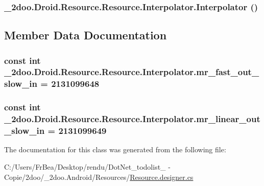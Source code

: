 \hypertarget{class__2doo_1_1_droid_1_1_resource_1_1_interpolator_e0b1f5f02599ec7e0eb2381eec78967a}{
\subsubsection[{Interpolator}]{\setlength{\rightskip}{0pt plus 5cm}\_\-2doo.Droid.Resource.Resource.Interpolator.Interpolator ()}}
\label{class__2doo_1_1_droid_1_1_resource_1_1_interpolator_e0b1f5f02599ec7e0eb2381eec78967a}




\subsection{Member Data Documentation}
\hypertarget{class__2doo_1_1_droid_1_1_resource_1_1_interpolator_dbcf29cded916c4980118b79e5236535}{
\subsubsection[{mr\_\-fast\_\-out\_\-slow\_\-in}]{\setlength{\rightskip}{0pt plus 5cm}const int \_\-2doo.Droid.Resource.Resource.Interpolator.mr\_\-fast\_\-out\_\-slow\_\-in = 2131099648}}
\label{class__2doo_1_1_droid_1_1_resource_1_1_interpolator_dbcf29cded916c4980118b79e5236535}


\hypertarget{class__2doo_1_1_droid_1_1_resource_1_1_interpolator_b7116ac4039731b22d455a3b5539f840}{
\subsubsection[{mr\_\-linear\_\-out\_\-slow\_\-in}]{\setlength{\rightskip}{0pt plus 5cm}const int \_\-2doo.Droid.Resource.Resource.Interpolator.mr\_\-linear\_\-out\_\-slow\_\-in = 2131099649}}
\label{class__2doo_1_1_droid_1_1_resource_1_1_interpolator_b7116ac4039731b22d455a3b5539f840}




The documentation for this class was generated from the following file:\begin{CompactItemize}
\item 
C:/Users/FrBea/Desktop/rendu/DotNet\_\-todolist\_ - Copie/2doo/\_\-2doo.Android/Resources/\hyperlink{_resource_8designer_8cs}{Resource.designer.cs}\end{CompactItemize}
